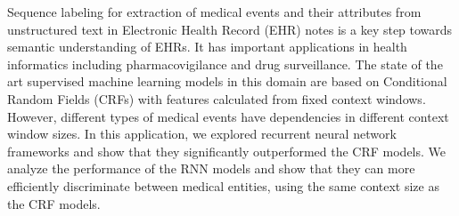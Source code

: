 Sequence labeling for extraction of medical events and their attributes from unstructured text in Electronic Health Record (EHR) notes is a key step towards semantic understanding of EHRs. It has important applications in health informatics including pharmacovigilance and drug surveillance. The state of the art supervised machine learning models in this domain are based on Conditional Random Fields (CRFs) with features calculated from fixed context windows. However, different types of medical events have dependencies in different context window sizes. In this application, we explored recurrent neural network frameworks and show that they significantly outperformed the CRF models. We analyze the performance of the RNN models and show that they can more efficiently discriminate between medical entities, using the same context size as the CRF models.
